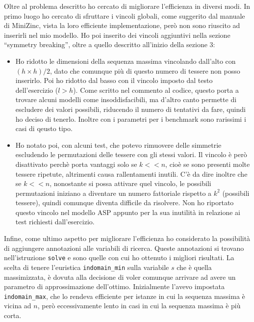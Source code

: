 \documentclass[12pt,a4paper,english,italian]{article}
\begin{document}
\bigskip
Oltre al problema descritto ho cercato di migliorare l'efficienza in diversi modi. In primo luogo ho cercato di sfruttare i vincoli globali, come suggerito dal manuale di MiniZinc, vista la loro efficiente implementazione, però non sono riuscito ad inserirli nel mio modello. Ho poi inserito dei vincoli aggiuntivi nella sezione ``symmetry breaking'', oltre a quello descritto all'inizio della sezione 3:
\begin{itemize}
	\item Ho ridotto le dimensioni della sequenza massima vincolando dall'alto con $(h \times h) / 2$, dato che comunque più di questo numero di tessere non posso inserirlo. Poi ho ridotto dal basso con il vincolo imposto dal testo dell'esercizio ($l>h$). Come scritto nel commento al codice, questo porta a trovare alcuni modelli come insoddisfacibili, ma d'altro canto permette di escludere dei valori possibili, riducendo il numero di tentativi da fare, quindi ho deciso di tenerlo. Inoltre con i parametri per i benchmark sono rarissimi i casi di qeusto tipo.
	\item Ho notato poi, con alcuni test, che potevo rimuovere delle simmetrie escludendo le permutazioni delle tessere con gli stessi valori. Il vincolo è però disattivato perchè porta vantaggi solo se $k << n$, cioè se sono presenti molte tessere ripetute, altrimenti causa rallentamenti inutili. C'è da dire inoltre che se $k << n$, nonostante si possa attivare quel vincolo, le possibili permutazioni iniziano a diventare un numero fattoriale rispetto a $k^2$ (possibili tessere), quindi comunque diventa difficile da risolvere. Non ho riportato questo vincolo nel modello ASP appunto per la sua inutilità in relazione ai test richiesti dall'esercizio.
\end{itemize}


Infine, come ultimo aspetto per migliorare l'efficienza ho considerato la possibilità di aggiungere annotazioni alle variabili di ricerca. Queste annotazioni si trovano nell'istruzione \texttt{solve} e sono quelle con cui ho ottenuto i migliori risultati. La scelta di tenere l'euristica \texttt{indomain\_min} sulla variabile $s$ che è quella massimizzata, è dovuta alla decisione di voler comunque arrivare ad avere un parametro di approssimazione dell'ottimo. Inizialmente l'avevo impostata \texttt{indomain\_max}, che lo rendeva efficiente per istanze in cui la sequenza massima è vicina ad $n$, però eccessivamente lento in casi in cui la sequenza massima è più corta.

\bigskip

\end{document}
